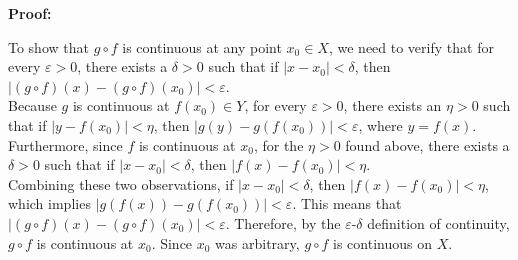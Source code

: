 \bigskip




\textbf{Proof:}

To show that $g \circ f$ is continuous at any point $x_0 \in X$, we need to verify that for every $\varepsilon > 0$, there exists a $\delta > 0$ such that if $|x - x_0| < \delta$, then $|(g \circ f)(x) - (g \circ f)(x_0)| < \varepsilon$.\\

Because $g$ is continuous at $f(x_0) \in Y$, for every $\varepsilon > 0$, there exists an $\eta > 0$ such that if $|y - f(x_0)| < \eta$, then $|g(y) - g(f(x_0))| < \varepsilon$, where $y = f(x)$.  Furthermore, since $f$ is continuous at $x_0$, for the $\eta > 0$ found above, there exists a $\delta > 0$ such that if $|x - x_0| < \delta$, then $|f(x) - f(x_0)| < \eta$.\\

Combining these two observations, if $|x - x_0| < \delta$, then $|f(x) - f(x_0)| < \eta$, which implies $|g(f(x)) - g(f(x_0))| < \varepsilon$. This means that $|(g \circ f)(x) - (g \circ f)(x_0)| < \varepsilon$.  Therefore, by the $\varepsilon$-$\delta$ definition of continuity, $g \circ f$ is continuous at $x_0$. Since $x_0$ was arbitrary, $g \circ f$ is continuous on $X$. 
\Qed


\bigskip
{}


\bigskip





